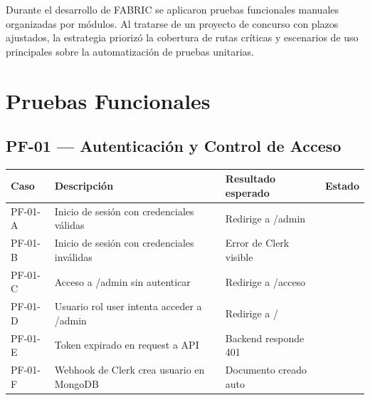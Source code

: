 \documentclass[12pt, a4paper, twoside]{report}
\newcommand{\cmark}{\textcolor{green!60!black}{\ding{51}}}
\begin{document}
Durante el desarrollo de FABRIC se aplicaron pruebas funcionales manuales organizadas por
módulos. Al tratarse de un proyecto de concurso con plazos ajustados, la estrategia priorizó
la cobertura de rutas críticas y escenarios de uso principales sobre la automatización de
pruebas unitarias.

\section{Pruebas Funcionales}

\subsection*{PF-01 — Autenticación y Control de Acceso}
\begin{center}
\begin{tabular}{C{1.5cm} L{5.5cm} L{4.5cm} C{1.5cm}}
  \toprule
  \textbf{Caso} & \textbf{Descripción} & \textbf{Resultado esperado} & \textbf{Estado} \\
  \midrule
  PF-01-A & Inicio de sesión con credenciales válidas     & Redirige a /admin        & \cmark \\
  PF-01-B & Inicio de sesión con credenciales inválidas   & Error de Clerk visible   & \cmark \\
  PF-01-C & Acceso a /admin sin autenticar                & Redirige a /acceso       & \cmark \\
  PF-01-D & Usuario rol user intenta acceder a /admin     & Redirige a /             & \cmark \\
  PF-01-E & Token expirado en request a API               & Backend responde 401     & \cmark \\
  PF-01-F & Webhook de Clerk crea usuario en MongoDB      & Documento creado auto    & \cmark \\
  \bottomrule
\end{tabular}
\end{center}
\end{document}
